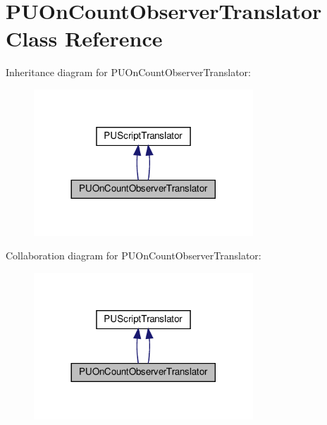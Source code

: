 \hypertarget{classPUOnCountObserverTranslator}{}\section{P\+U\+On\+Count\+Observer\+Translator Class Reference}
\label{classPUOnCountObserverTranslator}


Inheritance diagram for P\+U\+On\+Count\+Observer\+Translator\+:
\nopagebreak
\begin{figure}[H]
\begin{center}
\leavevmode
\includegraphics[width=233pt]{classPUOnCountObserverTranslator__inherit__graph}
\end{center}
\end{figure}


Collaboration diagram for P\+U\+On\+Count\+Observer\+Translator\+:
\nopagebreak
\begin{figure}[H]
\begin{center}
\leavevmode
\includegraphics[width=233pt]{classPUOnCountObserverTranslator__coll__graph}
\end{center}
\end{figure}
